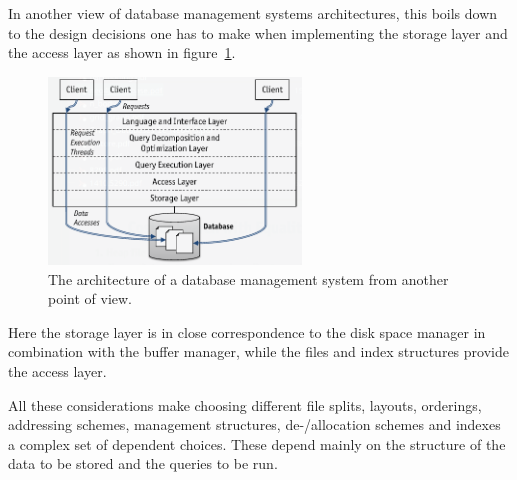         In another view of database management systems architectures, this boils down to the design decisions one has to make when implementing the storage layer and the access layer as shown in figure~\ref{dbms_arch_layers}.

        \begin{figure}[htp]\label{dbms_arch_layers}
        \begin{center}
        \includegraphics[keepaspectratio,width=0.6\textwidth]{img/00_intro/layered_RDBMS.png}
        \end{center}
        \caption{The architecture of a database management system from another point of view.} %
        \end{figure}

        Here the storage layer is in close correspondence to the disk space manager in combination with the buffer manager, while the files and index structures provide the access layer.

        All these considerations make choosing different file splits, layouts, orderings, addressing schemes, management structures, de-/allocation schemes and indexes a complex set of dependent choices. 
        These depend mainly on the structure of the data to be stored and the queries to be run.



